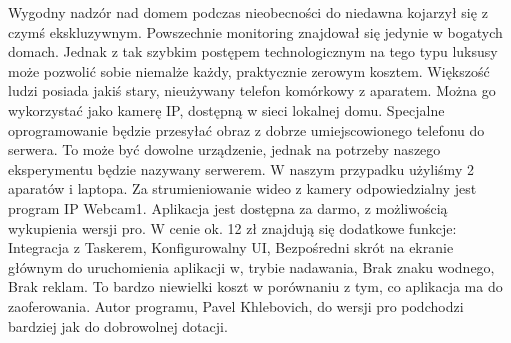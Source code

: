 \documentclass[brudnopis]{xmgr}
\begin{document}
Wygodny nadzór nad domem podczas nieobecności do niedawna kojarzył się z czymś ekskluzywnym. Powszechnie monitoring znajdował się jedynie w bogatych domach. Jednak z tak szybkim postępem technologicznym na tego typu luksusy może pozwolić sobie niemalże każdy, praktycznie zerowym kosztem. Większość ludzi posiada jakiś stary, nieużywany telefon komórkowy z aparatem. Można go wykorzystać jako kamerę IP, dostępną w sieci lokalnej domu. Specjalne oprogramowanie będzie przesyłać obraz z dobrze umiejscowionego telefonu do serwera. To może być dowolne urządzenie, jednak na potrzeby naszego eksperymentu będzie nazywany serwerem. W naszym przypadku użyliśmy 2 aparatów i laptopa.
Za strumieniowanie wideo z kamery odpowiedzialny jest program IP Webcam1. Aplikacja jest dostępna za darmo, z możliwością wykupienia wersji pro. W cenie ok. 12 zł znajdują się dodatkowe funkcje:
Integracja z Taskerem,
Konfigurowalny UI,
Bezpośredni skrót na ekranie głównym do uruchomienia aplikacji w, trybie nadawania,
Brak znaku wodnego,
Brak reklam.
To bardzo niewielki koszt w porównaniu z tym, co aplikacja ma do zaoferowania. Autor programu, Pavel Khlebovich, do wersji pro  podchodzi bardziej jak do dobrowolnej dotacji.
\end{document}
